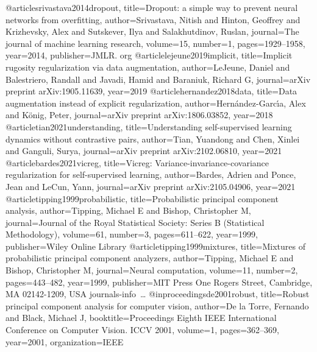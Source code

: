 \documentclass[nohyperref]{article}
\theoremstyle{plain}
\theoremstyle{definition}
\theoremstyle{remark}
\begin{document}
@article{srivastava2014dropout,
  title={Dropout: a simple way to prevent neural networks from overfitting},
  author={Srivastava, Nitish and Hinton, Geoffrey and Krizhevsky, Alex and Sutskever, Ilya and Salakhutdinov, Ruslan},
  journal={The journal of machine learning research},
  volume={15},
  number={1},
  pages={1929--1958},
  year={2014},
  publisher={JMLR. org}
}
@article{lejeune2019implicit,
  title={Implicit rugosity regularization via data augmentation},
  author={LeJeune, Daniel and Balestriero, Randall and Javadi, Hamid and Baraniuk, Richard G},
  journal={arXiv preprint arXiv:1905.11639},
  year={2019}
}
@article{hernandez2018data,
  title={Data augmentation instead of explicit regularization},
  author={Hern{\'a}ndez-Garc{\'\i}a, Alex and K{\"o}nig, Peter},
  journal={arXiv preprint arXiv:1806.03852},
  year={2018}
}
@article{tian2021understanding,
  title={Understanding self-supervised learning dynamics without contrastive pairs},
  author={Tian, Yuandong and Chen, Xinlei and Ganguli, Surya},
  journal={arXiv preprint arXiv:2102.06810},
  year={2021}
}
@article{bardes2021vicreg,
  title={Vicreg: Variance-invariance-covariance regularization for self-supervised learning},
  author={Bardes, Adrien and Ponce, Jean and LeCun, Yann},
  journal={arXiv preprint arXiv:2105.04906},
  year={2021}
}
@article{tipping1999probabilistic,
  title={Probabilistic principal component analysis},
  author={Tipping, Michael E and Bishop, Christopher M},
  journal={Journal of the Royal Statistical Society: Series B (Statistical Methodology)},
  volume={61},
  number={3},
  pages={611--622},
  year={1999},
  publisher={Wiley Online Library}
}
@article{tipping1999mixtures,
  title={Mixtures of probabilistic principal component analyzers},
  author={Tipping, Michael E and Bishop, Christopher M},
  journal={Neural computation},
  volume={11},
  number={2},
  pages={443--482},
  year={1999},
  publisher={MIT Press One Rogers Street, Cambridge, MA 02142-1209, USA journals-info~…}
}
@inproceedings{de2001robust,
  title={Robust principal component analysis for computer vision},
  author={De la Torre, Fernando and Black, Michael J},
  booktitle={Proceedings Eighth IEEE International Conference on Computer Vision. ICCV 2001},
  volume={1},
  pages={362--369},
  year={2001},
  organization={IEEE}
} 



\appendix

\end{document}
